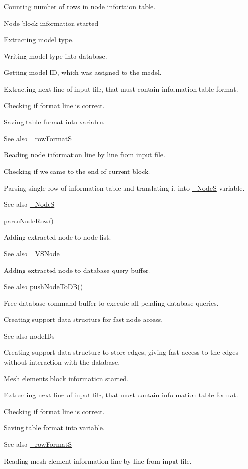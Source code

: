 Counting number of rows in node infortaion table.

Node block information started.

Extracting model type.

Writing model type into database.

Getting model ID, which was assigned to the model.

Extracting next line of input file, that must contain information table format.

Checking if format line is correct.

Saving table format into variable. \begin{DoxySeeAlso}{See also}
\hyperlink{struct__row_format_s}{\+\_\+row\+FormatS}
\end{DoxySeeAlso}
Reading node information line by line from input file.

Checking if we came to the end of current block.

Parsing single row of information table and translating it into \hyperlink{struct___node_s}{\+\_\+\+NodeS} variable. \begin{DoxySeeAlso}{See also}
\hyperlink{struct___node_s}{\+\_\+\+NodeS} 

parse\+Node\+Row()
\end{DoxySeeAlso}
Adding extracted node to node list. \begin{DoxySeeAlso}{See also}
\+\_\+\+V\+S\+Node
\end{DoxySeeAlso}
Adding extracted node to database query buffer. \begin{DoxySeeAlso}{See also}
push\+Node\+To\+D\+B()
\end{DoxySeeAlso}
Free database command buffer to execute all pending database queries.

Creating support data structure for fast node access. \begin{DoxySeeAlso}{See also}
node\+I\+Ds
\end{DoxySeeAlso}
Creating support data structure to store edges, giving fast access to the edges without interaction with the database.

Mesh elements block information started.

Extracting next line of input file, that must contain information table format.

Checking if format line is correct.

Saving table format into variable. \begin{DoxySeeAlso}{See also}
\hyperlink{struct__row_format_s}{\+\_\+row\+FormatS}
\end{DoxySeeAlso}
Reading mesh element information line by line from input file.


